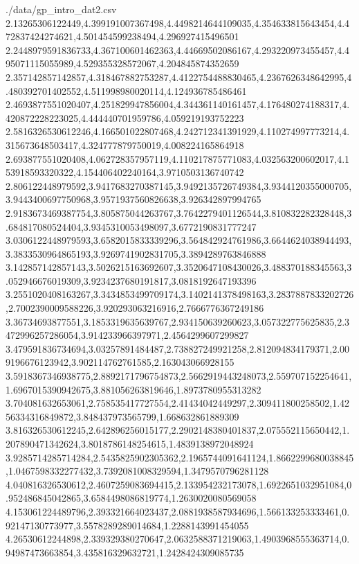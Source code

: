 \begin{filecontents*}{./data/gp_intro_dat2.csv}
    2.13265306122449,4.399191007367498,4.4498214644109035,4.354633815643454,4.472837424274621,4.501454599238494,4.296927415496501
    2.2448979591836733,4.367100601462363,4.44669502086167,4.293220973455457,4.495071115055989,4.529355328572067,4.204845874352659
    2.357142857142857,4.318467882753287,4.4122754488830465,4.2367626348642995,4.480392701402552,4.511998980020114,4.124936785486461
    2.4693877551020407,4.251829947856004,4.344361140161457,4.176480274188317,4.420872228223025,4.444440701959786,4.059219193752223
    2.5816326530612246,4.166501022807468,4.242712341391929,4.110274997773214,4.315673648503417,4.324777879750019,4.008224165864918
    2.693877551020408,4.062728357957119,4.110217875771083,4.032563200602017,4.153918593320322,4.154406402240164,3.9710503136740742
    2.806122448979592,3.9417683270387145,3.9492135726749384,3.9344120355000705,3.9443400697750968,3.9571937560826638,3.926342897994765
    2.9183673469387754,3.805875044263767,3.7642279401126544,3.810832282328448,3.684817080524404,3.9345310053498097,3.6772190831777247
    3.0306122448979593,3.6582015833339296,3.564842924761986,3.6644624038944493,3.3833530964865193,3.9269741902831705,3.3894289763846888
    3.142857142857143,3.5026215163692607,3.3520647108430026,3.488370188345563,3.052946676019309,3.9234237680191817,3.0818192647193396
    3.2551020408163267,3.3434853499709174,3.1402141378498163,3.2837887833202726,2.7002390009588226,3.920293063216916,2.7666776367249186
    3.36734693877551,3.1853319635639767,2.934150639260623,3.057322775625835,2.3472996257286054,3.914233966397971,2.4564299607299827
    3.479591836734694,3.03257891484487,2.738827249921258,2.812094834179371,2.009196676123942,3.902114762761585,2.163043066928155
    3.5918367346938775,2.8892171796754873,2.5662919443248073,2.559707152254641,1.6967015390942675,3.881056263819646,1.8973780955313282
    3.704081632653061,2.758535417727554,2.41434042449297,2.309411800258502,1.4256334316849872,3.848437973565799,1.668632861889309
    3.816326530612245,2.642896256015177,2.2902148380401837,2.075552115650442,1.207890471342624,3.8018786148254615,1.4839138972048924
    3.9285714285714284,2.5435825902305362,2.1965744091641124,1.8662299680038845,1.0467598332277432,3.7392081008329594,1.3479570796281128
    4.040816326530612,2.4607259083694415,2.133954232173078,1.6922651032951084,0.952486845042865,3.6584498086819774,1.2630020080569058
    4.153061224489796,2.393321664023437,2.0881938587934696,1.566133253333461,0.92147130773977,3.5578289289014684,1.2288143991454055
    4.26530612244898,2.339329380270647,2.0632588371219063,1.4903968555363714,0.94987473663854,3.435816329632721,1.2428424309085735

\end{filecontents*}
